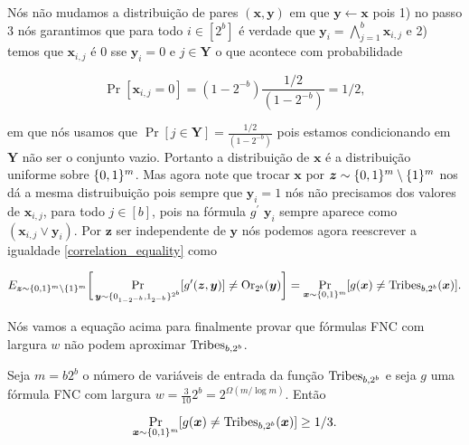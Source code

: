 Nós não mudamos a distribuição de pares $(\boldsymbol{x}, \boldsymbol{y})$ em que $\boldsymbol{y} \leftarrow \boldsymbol{x}$ pois 1) no passo 3 nós garantimos que para todo $i \in [2^{b}]$ é verdade que $\boldsymbol{y}_{i} = \bigwedge_{j = 1}^{b} \boldsymbol{x}_{i, j}$ e 2) temos que $\boldsymbol{x}_{i, j}$ é 0 sse $\boldsymbol{y}_{i} = 0$ e $j \in \boldsymbol{Y}$ o que acontece com probabilidade

\begin{equation*}
    \Pr[\boldsymbol{x}_{i, j} = 0] = (1 - 2^{-b})\frac{1/2}{(1 - 2^{-b})} = 1/2,
\end{equation*}

em que nós usamos que $\Pr[j \in \boldsymbol{Y}] = \frac{1/2}{(1 - 2^{-b})}$ pois estamos condicionando em $\boldsymbol{Y}$ não ser o conjunto vazio. Portanto a distribuição de $\boldsymbol{x}$ é a distribuição uniforme sobre $\{0, 1\}^{m}$. Mas agora note que trocar $\boldsymbol{x}$ por $\boldsymbol{z} \sim \{0, 1\}^{m}\setminus \{1\}^{m}$ nos dá a mesma distruibuição pois sempre que $\boldsymbol{y}_{i} = 1$ nós não precisamos dos valores de $\boldsymbol{x}_{i, j}$, para todo $j \in [b]$, pois na fórmula $g^{\prime}$ $\boldsymbol{y}_{i}$ sempre aparece como $(\boldsymbol{x}_{i, j} \lor \boldsymbol{y}_{i})$. Por $\boldsymbol{z}$ ser independente de $\boldsymbol{y}$ nós podemos agora reescrever a igualdade \ref{correlation_equality} como

\begin{equation} \label{correlation_equality_with_z}
    E_{\boldsymbol{z} \sim \{0, 1\}^{m}\setminus\{1\}^{m}} \bigg[ \Pr_{\boldsymbol{y} \sim \{0_{1 - 2^{-b}}, 1_{2^{-b}} \}^{2^{b}}}[g^{\prime}(\boldsymbol{z}, \boldsymbol{y})] \neq \text{Or}_{2^{b}}(\boldsymbol{y}) \bigg] = \Pr_{\boldsymbol{x} \sim \{0, 1\}^{m}}[g(\boldsymbol{x}) \neq \text{Tribes}_{b, 2^{b}}(\boldsymbol{x})].
\end{equation}

Nós vamos a equação acima para finalmente provar que fórmulas FNC com largura $w$ não podem aproximar $\text{Tribes}_{b, 2^{b}}$.

\begin{teo} \label{tribes_width_lb}

Seja $m = b2^{b}$ o número de variáveis de entrada da função $\text{Tribes}_{b, 2^{b}}$ e seja $g$ uma fórmula FNC com largura $w = \frac{3}{10}2^{b} = 2^{\Omega(m/\log m)}$. Então

\begin{equation*}
    \Pr_{\boldsymbol{x} \sim \{0, 1\}^{m}}[g(\boldsymbol{x}) \neq \text{Tribes}_{b, 2^{b}}(\boldsymbol{x})] \geq 1/3.
\end{equation*}

\end{teo}

